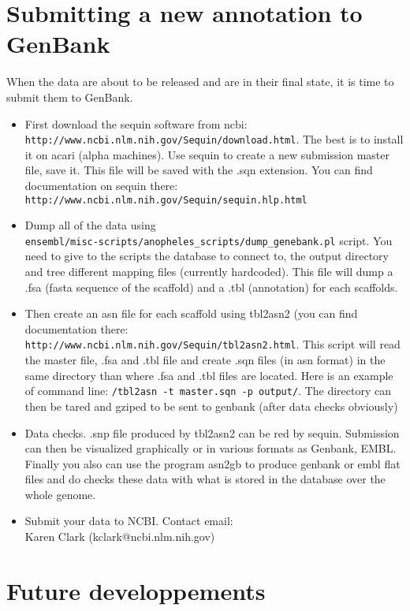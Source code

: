 \documentclass[a4paper,10pt]{article}
\begin{document}
\section{Submitting a new annotation to GenBank}
When the data are about to be released and are in their final state, it is time to submit them to GenBank.
\begin{itemize}
\item{First download the sequin software from ncbi:\\ 
\texttt{http://www.ncbi.nlm.nih.gov/Sequin/download.html}. The best is to install it on acari (alpha machines). Use sequin to create a new submission master file, save it. This file will be saved with the .sqn extension. You can find documentation on sequin there: \\
\texttt{http://www.ncbi.nlm.nih.gov/Sequin/sequin.hlp.html}}
\item{Dump all of the data using\\ 
\texttt{ensembl/misc-scripts/anopheles\_scripts/dump\_genebank.pl} script. You need to give to the scripts the database to connect to, the output directory and tree different mapping files (currently hardcoded). This file will dump a .fsa (fasta sequence of the scaffold) and a .tbl (annotation) for each scaffolds.}
\item{Then create an asn file for each scaffold using tbl2asn2 (you can find documentation there:\\ 
\texttt{http://www.ncbi.nlm.nih.gov/Sequin/tbl2asn2.html}. This script will read the master file, .fsa and .tbl file and create .sqn files (in asn format) in the same directory than where .fsa and .tbl files are located. Here is an example of command line: \texttt{/tbl2asn -t master.sqn -p output/}. The directory can then be tared and gziped to be sent to genbank (after data checks obviously)}
\item{Data checks. .snp file produced by tbl2asn2 can be red by sequin. Submission can then be visualized graphically or in various formats as Genbank, EMBL. Finally you also can use the program asn2gb to produce genbank or embl flat files and do checks these data with what is stored in the database over the whole genome.}
\item{Submit your data to NCBI. Contact email:\\ Karen Clark (kclark@ncbi.nlm.nih.gov)}
\end{itemize}

\section{Future developpements}
\end{document}
